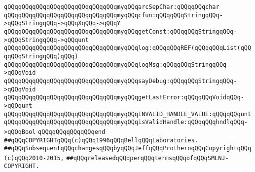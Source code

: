 \verb|qQQqqQQqqQQqqQQqqQQqqQQqqQQqqQQqmyqQQqarcSepChar:qQQqqQQqchar|\newline
\newline
\verb|qQQqqQQqqQQqqQQqqQQqqQQqqQQqqQQqmyqQQqcfun:qQQqqQQqStringqQQq->qQQqStringqQQq->qQQqXqQQq->qQQqY|\newline
\verb|qQQqqQQqqQQqqQQqqQQqqQQqqQQqqQQqmyqQQqgetConst:qQQqqQQqStringqQQq->qQQqStringqQQq->qQQqunt|\newline
\newline
\verb|qQQqqQQqqQQqqQQqqQQqqQQqqQQqqQQqmyqQQqlog:qQQqqQQqREF(qQQqqQQqList(qQQqqQQqStringqQQq)qQQq)|\newline
\verb|qQQqqQQqqQQqqQQqqQQqqQQqqQQqqQQqmyqQQqlogMsg:qQQqqQQqStringqQQq->qQQqVoid|\newline
\newline
\verb|qQQqqQQqqQQqqQQqqQQqqQQqqQQqqQQqmyqQQqsayDebug:qQQqqQQqStringqQQq->qQQqVoid|\newline
\newline
\verb|qQQqqQQqqQQqqQQqqQQqqQQqqQQqqQQqmyqQQqgetLastError:qQQqqQQqVoidqQQq->qQQqunt|\newline
\newline
\verb|qQQqqQQqqQQqqQQqqQQqqQQqqQQqqQQqmyqQQqINVALID_HANDLE_VALUE:qQQqqQQqunt|\newline
\verb|qQQqqQQqqQQqqQQqqQQqqQQqqQQqqQQqmyqQQqisValidHandle:qQQqqQQqhndlqQQq->qQQqBool|\newline
\verb|qQQqqQQqqQQqqQQqend|\newline
\newline
\newline
\newline
\verb|##qQQqCOPYRIGHTqQQq(c)qQQq1996qQQqBellqQQqLaboratories.|\newline
\verb|##qQQqSubsequentqQQqchangesqQQqbyqQQqJeffqQQqProtheroqQQqCopyrightqQQq(c)qQQq2010-2015,|\newline
\verb|##qQQqreleasedqQQqperqQQqtermsqQQqofqQQqSMLNJ-COPYRIGHT.|\newline

